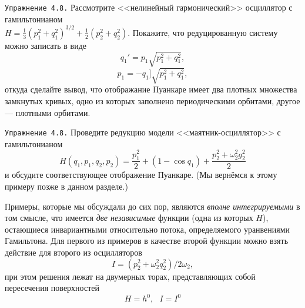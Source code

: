 \documentclass[twoside, a4paper]{article}
\begin{document}
\newcommand{\task}[1]{\par{} \texttt{Упражнение 4.8.\thetaskc} {\small#1}}
\task{
Рассмотрите <<нелинейный гармонический>> осциллятор с гамильтонианом\\ $H=\frac13(p_1^2+q_1^2)^{3/2}+\frac12(p_2^2+q_2^2)$. Покажите, что редуцированную систему можно записать в виде 
$$q_1'=p_1\sqrt{p_1^2+q_1^2},$$
$$p_1=-q_1]\sqrt{p_1^2+q_1^2},$$
откуда сделайте вывод, что отображание Пуанкаре имеет два плотных множества замкнутых кривых, одно из которых заполнено периодическими орбитами, другое --- плотными орбитами.
}\label{red_sys}
\task{
Проведите редукцию модели <<маятник-осциллятор>> с гамильтонианом
$$H(q_1,p_1,q_2,p_2)=\frac{p_1^2}{2}+(1-\cos q_1)+\frac{p_2^2+\omega_2^2g_2^2}{2}$$
и обсудите соответствующее отображение Пуанкаре. (Мы вернёмся к этому примеру позже в данном разделе.)
}\label{osc}

Примеры, которые мы обсуждали до сих пор, являются \textit{вполне интегрируемыми} в том смысле, что имеется \textit{две независимые} функции (одна из которых $H$), остающиеся инвариантными относительно потока, определяемого уранвениями Гамильтона. Для первого из примеров в качестве второй функции можно взять действие для второго из осцилляторов
$$I=(p_2^2+\omega_2^2q_2^2)/2\omega_2,$$
при этом решения лежат на двумерных торах, представляющих собой пересечения поверхностей
\renewcommand{\theequation}{4.8.\arabic{equation}}
\setcounter{equation}{17}
\begin{equation}
H = h^0,\text{~~} I=I^0
\end{equation}
\end{document}

